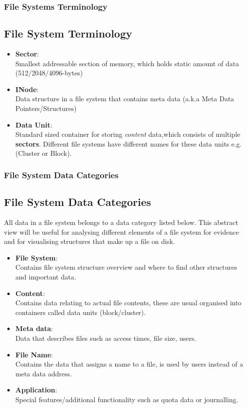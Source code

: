\documentclass{beamer}
\begin{document}
\begin{frame}
	\frametitle{File Systems Terminology}
	\subsection*{File System Terminology}
	\begin{itemize}
		\item{\textbf{Sector}}:\\ Smallest addressable section of memory, which holds static amount of data (512/2048/4096-bytes)
		\item\textbf{INode}:\\ Data structure in a file system that contains meta data (a.k.a Meta Data Pointers/Structures)
		\item\textbf{Data Unit}:\\ Standard sized container for storing \textit{content} data,which consists of multiple \textbf{sectors}. Different file systems have different names for these data units e.g. (Cluster or Block). 
	\end{itemize}
\end{frame}

\begin{frame}
	\frametitle{File System Data Categories}
	\subsection*{File System Data Categories}
	All data in a file system belongs to a data category listed below. This abstract view will be useful for analysing different elements of a file system for evidence and for visualising structures that make up a file on disk.
	\begin{itemize}
		\item \textbf{File System}: \\ Contains file system structure overview and where to find other structures and important data.
		\item \textbf{Content}: \\ Contains data relating to actual file contents, these are usual organised into containers called data units (block/cluster).
		\item \textbf{Meta data}: \\ Data that describes files such as access times, file size, users.
		\item \textbf{File Name}: \\ Contains the data that assigns a name to a file, is used by users instead of a meta data address.
		\item \textbf{Application}: \\ Special features/additional functionality such as quota data or journalling.	
	\end{itemize}	    
\end{frame}
\end{document}
